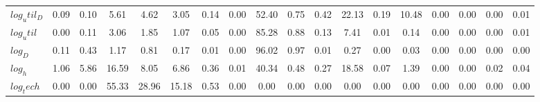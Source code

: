 \begin{center}
\begin{longtable}{lccccccccccccccccc}
$log_util_D   $	 & 	            0.09	 & 	            0.10	 & 	            5.61	 & 	            4.62	 & 	            3.05	 & 	            0.14	 & 	            0.00	 & 	           52.40	 & 	            0.75	 & 	            0.42	 & 	           22.13	 & 	            0.19	 & 	           10.48	 & 	            0.00	 & 	            0.00	 & 	            0.00	 & 	            0.01 \\ 
$log_util     $	 & 	            0.00	 & 	            0.11	 & 	            3.06	 & 	            1.85	 & 	            1.07	 & 	            0.05	 & 	            0.00	 & 	           85.28	 & 	            0.88	 & 	            0.13	 & 	            7.41	 & 	            0.01	 & 	            0.14	 & 	            0.00	 & 	            0.00	 & 	            0.00	 & 	            0.01 \\ 
$log_D        $	 & 	            0.11	 & 	            0.43	 & 	            1.17	 & 	            0.81	 & 	            0.17	 & 	            0.01	 & 	            0.00	 & 	           96.02	 & 	            0.97	 & 	            0.01	 & 	            0.27	 & 	            0.00	 & 	            0.03	 & 	            0.00	 & 	            0.00	 & 	            0.00	 & 	            0.00 \\ 
$log_h        $	 & 	            1.06	 & 	            5.86	 & 	           16.59	 & 	            8.05	 & 	            6.86	 & 	            0.36	 & 	            0.01	 & 	           40.34	 & 	            0.48	 & 	            0.27	 & 	           18.58	 & 	            0.07	 & 	            1.39	 & 	            0.00	 & 	            0.00	 & 	            0.02	 & 	            0.04 \\ 
$log_tech     $	 & 	            0.00	 & 	            0.00	 & 	           55.33	 & 	           28.96	 & 	           15.18	 & 	            0.53	 & 	            0.00	 & 	            0.00	 & 	            0.00	 & 	            0.00	 & 	            0.00	 & 	            0.00	 & 	            0.00	 & 	            0.00	 & 	            0.00	 & 	            0.00	 & 	            0.00 \\ 
\end{longtable}
 \end{center}
